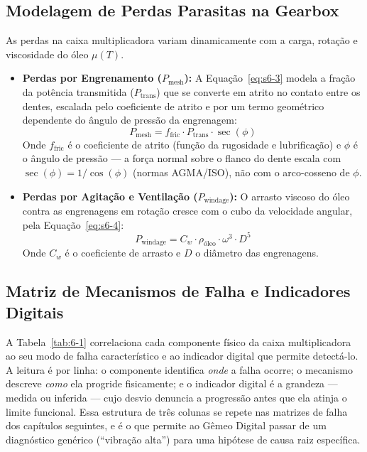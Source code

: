 \documentclass[12pt,a4paper]{article}
\numberwithin{equation}{section}
\numberwithin{table}{section}
\numberwithin{figure}{section}
\begin{document}
	\subsection{\textbf{Modelagem de Perdas Parasitas na Gearbox}}
	As perdas na caixa multiplicadora variam dinamicamente com a carga, rotação e viscosidade do óleo $\mu(T)$.
	\begin{itemize}
		\item \textbf{Perdas por Engrenamento ($P_{\text{mesh}}$):} A Equação~\eqref{eq:s6-3} modela a fração da potência transmitida ($P_{\text{trans}}$) que se converte em atrito no contato entre os dentes, escalada pelo coeficiente de atrito e por um termo geométrico dependente do ângulo de pressão da engrenagem:
		\begin{equation}\label{eq:s6-3}
 P_{\text{mesh}} = f_{\text{fric}} \cdot P_{\text{trans}} \cdot \sec(\phi)
\end{equation}
		Onde $f_{\text{fric}}$ é o coeficiente de atrito (função da rugosidade e lubrificação) e $\phi$ é o ângulo de pressão — a força normal sobre o flanco do dente escala com $\sec(\phi) = 1/\cos(\phi)$ (normas AGMA/ISO), não com o arco-cosseno de $\phi$.
		\item \textbf{Perdas por Agitação e Ventilação ($P_{\text{windage}}$):} O arrasto viscoso do óleo contra as engrenagens em rotação cresce com o cubo da velocidade angular, pela Equação~\eqref{eq:s6-4}:
		\begin{equation}\label{eq:s6-4}
 P_{\text{windage}} = C_w \cdot \rho_{\text{óleo}} \cdot \omega^3 \cdot D^5 
\end{equation}
		Onde $C_w$ é o coeficiente de arrasto e $D$ o diâmetro das engrenagens.
	\end{itemize}
	
	\subsection{\textbf{Matriz de Mecanismos de Falha e Indicadores Digitais}}
	A Tabela~\ref{tab:6-1} correlaciona cada componente físico da caixa multiplicadora ao seu modo de falha característico e ao indicador digital que permite detectá-lo. A leitura é por linha: o componente identifica \textit{onde} a falha ocorre; o mecanismo descreve \textit{como} ela progride fisicamente; e o indicador digital é a grandeza — medida ou inferida — cujo desvio denuncia a progressão antes que ela atinja o limite funcional. Essa estrutura de três colunas se repete nas matrizes de falha dos capítulos seguintes, e é o que permite ao Gêmeo Digital passar de um diagnóstico genérico (``vibração alta'') para uma hipótese de causa raiz específica.
	
\end{document}
